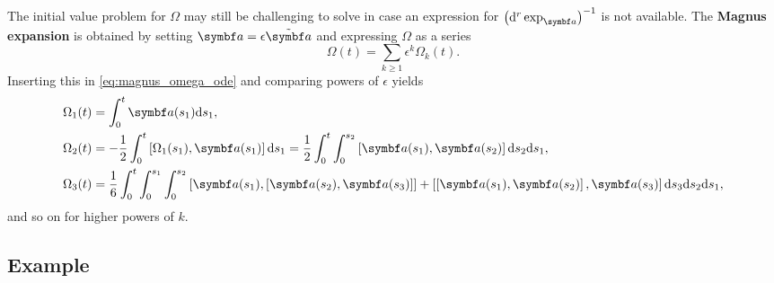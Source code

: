 The initial value problem for $\Omega$ may still be challenging to solve in case an expression for $\left(\mathrm{d}^r \exp_\a \right)^{-1}$ is not available. The \textbf{Magnus expansion} is obtained by setting $\a = \epsilon \tilde \a$ and expressing $\Omega$ as a series
\begin{equation}
  \Omega(t) = \sum_{k \geq 1} \epsilon^k \Omega_k(t).
\end{equation}
Inserting this in \eqref{eq:magnus_omega_ode} and comparing powers of $\epsilon$ yields
\begin{equation}
  \begin{aligned}
    \Omega_1(t) & = \int_0^t \a(s_1) \mathrm{d}s_1,                                                                                                                                                                                 \\
    \Omega_2(t) & = -\frac{1}{2} \int_0^t \left[ \Omega_1(s_1), \a(s_1) \right] \mathrm{d}s_1 = \frac{1}{2} \int_0^t \int_{0}^{s_2} \left[ \a(s_1), \a(s_2) \right] \mathrm{d} s_2 \mathrm{d} s_1,                                    \\
    \Omega_3(t) & = \frac{1}{6} \int_{0}^t \int_{0}^{s_1} \int_{0}^{s_2} \left[ \a(s_1), \left[ \a(s_2), \a(s_3) \right] \right] + \left[ \left[ \a(s_1), \a(s_2) \right], \a(s_3) \right] \mathrm{d} s_3 \mathrm{d} s_2 \mathrm{d} s_1,
  \end{aligned}
\end{equation}
and so on for higher powers of $k$.

\subsection{Example}

